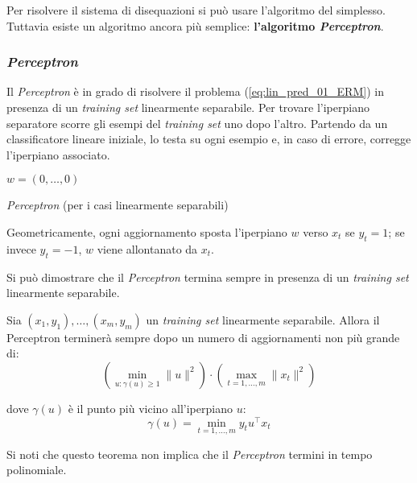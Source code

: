 Per risolvere il sistema di disequazioni si può usare l'algoritmo del
simplesso. Tuttavia esiste un algoritmo ancora più semplice: 
\textbf{l'algoritmo \textit{Perceptron}}.

\subsubsection{\textit{Perceptron}}
Il \textit{Perceptron} è in grado di risolvere il problema 
(\ref{eq:lin_pred_01_ERM}) in presenza di un \textit{training set} 
linearmente separabile. Per trovare l'iperpiano separatore scorre gli esempi
del \textit{training set} uno dopo l'altro. Partendo da un classificatore
lineare iniziale, lo testa su ogni esempio e, in caso di errore, corregge
l'iperpiano associato.

\begin{algorithm}[h]
   \DontPrintSemicolon
   $w=(0,\dots,0)$\;
   \caption{\textit{Perceptron} (per i casi linearmente separabili)}
\end{algorithm}

Geometricamente, ogni aggiornamento sposta l'iperpiano $w$ verso $x_t$ se
$y_t=1$; se invece $y_t=-1$, $w$ viene allontanato da $x_t$.

Si può dimostrare che il \textit{Perceptron} termina sempre in presenza
di un \textit{training set} linearmente separabile.

\begin{theorem}\label{theor:perc_conv}
   Sia $(x_1,y_1),\dots,(x_m,y_m)$ un \textit{training set} linearmente
   separabile. Allora il Perceptron terminerà sempre dopo un numero di
   aggiornamenti non più grande di:
   $$ \left(\min_{\displaystyle u:\gamma(u)\geq1} \|u\|^2 \right)\cdot
      \left(\max_{\displaystyle t=1,\dots,m}\|x_t\|^2\right) $$

   dove $\gamma(u)$ è il punto più vicino all'iperpiano $u$:
   $$ \gamma(u) = \min_{t=1,\dots,m} y_t u^\top x_t $$
\end{theorem}

Si noti che questo teorema non implica che il \textit{Perceptron} termini
in tempo polinomiale.

